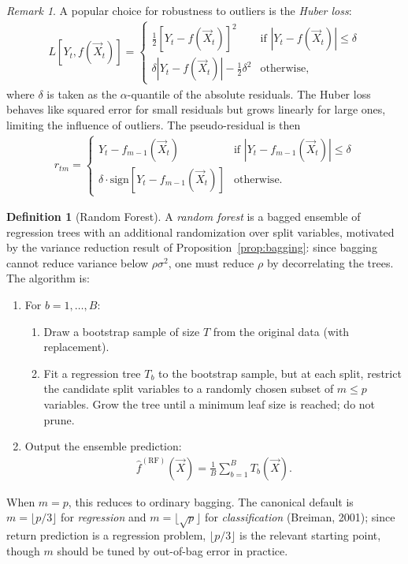 \documentclass[11pt]{article}
\theoremstyle{definition}
\newtheorem{definition}{Definition}[section]
\theoremstyle{plain}
\theoremstyle{remark}
\newtheorem{remark}{Remark}[section]
\begin{document}
\begin{remark}
    A popular choice for robustness to outliers is the \textit{Huber loss}:
    \begin{align}
        L[Y_t, f(\vec{X}_t)] = \begin{cases} \frac{1}{2}[Y_t - f(\vec{X}_t)]^2 & \text{if } |Y_t - f(\vec{X}_t)| \leq \delta \\ \delta|Y_t - f(\vec{X}_t)| - \frac{1}{2}\delta^2 & \text{otherwise,} \end{cases}
    \end{align}
    where $\delta$ is taken as the $\alpha$-quantile of the absolute residuals. The Huber loss behaves like squared error for small residuals but grows linearly for large ones, limiting the influence of outliers. The pseudo-residual is then
    \begin{align}
        r_{tm} = \begin{cases} Y_t - f_{m-1}(\vec{X}_t) & \text{if } |Y_t - f_{m-1}(\vec{X}_t)| \leq \delta \\ \delta \cdot \text{sign}[Y_t - f_{m-1}(\vec{X}_t)] & \text{otherwise.} \end{cases}
    \end{align}
\end{remark}

\begin{definition}[Random Forest]
    A \textit{random forest} is a bagged ensemble of regression trees with an additional randomization over split variables, motivated by the variance reduction result of Proposition~\ref{prop:bagging}: since bagging cannot reduce variance below $\rho\sigma^2$, one must reduce $\rho$ by decorrelating the trees. The algorithm is:
    \begin{enumerate}
        \item For $b = 1, \dots, B$:
        \begin{enumerate}
            \item Draw a bootstrap sample of size $T$ from the original data (with replacement).
            \item Fit a regression tree $T_b$ to the bootstrap sample, but at each split, restrict the candidate split variables to a randomly chosen subset of $m \leq p$ variables. Grow the tree until a minimum leaf size is reached; do not prune.
        \end{enumerate}
        \item Output the ensemble prediction:
        \begin{align}
            \hat{f}^{(\text{RF})}(\vec{X}) = \frac{1}{B}\sum_{b=1}^B T_b(\vec{X}).
        \end{align}
    \end{enumerate}
    When $m = p$, this reduces to ordinary bagging. The canonical default is $m = \lfloor p/3 \rfloor$ for \emph{regression} and $m = \lfloor\sqrt{p}\rfloor$ for \emph{classification} (Breiman, 2001); since return prediction is a regression problem, $\lfloor p/3\rfloor$ is the relevant starting point, though $m$ should be tuned by out-of-bag error in practice.
\end{definition}
\end{document}
